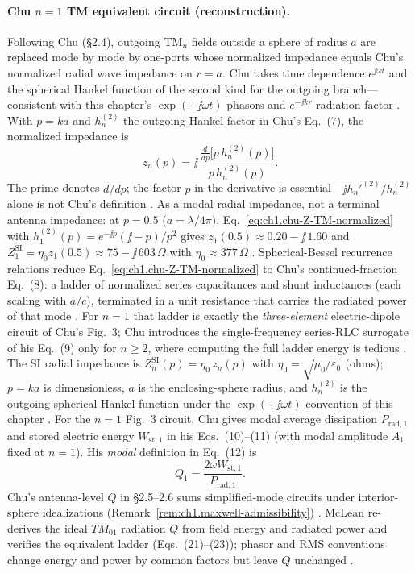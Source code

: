\paragraph{Chu $n=1$ TM equivalent circuit (reconstruction).}
Following Chu \cite{chu1948,chu1948tr064} (\S2.4), outgoing TM$_n$ fields outside a sphere of radius $a$ are replaced mode by mode by one-ports whose normalized impedance equals Chu's normalized radial wave impedance on $r=a$. Chu takes time dependence $e^{\jj\omega t}$ and the spherical Hankel function of the second kind for the outgoing branch---consistent with this chapter's $\exp(+\jj\omega t)$ phasors and $e^{-\jj kr}$ radiation factor \cite{chu1948,chu1948tr064,stratton1941}. With $p=ka$ and $h_n^{(2)}$ the outgoing Hankel factor in Chu's Eq.~(7), the normalized impedance is
\begin{equation}
\label{eq:ch1.chu-Z-TM-normalized}
z_n(p)=\jj\,\frac{\displaystyle\frac{d}{dp}\bigl[p\,h_n^{(2)}(p)\bigr]}{p\,h_n^{(2)}(p)}.
\end{equation}
The prime denotes $d/dp$; the factor $p$ in the derivative is essential---$\jj h_n'^{(2)}/h_n^{(2)}$ alone is not Chu's definition \cite{chu1948tr064}. As a modal radial impedance, not a terminal antenna impedance: at $p=0.5$ ($a=\lambda/4\pi$), Eq.~\eqref{eq:ch1.chu-Z-TM-normalized} with $h_1^{(2)}(p)=e^{-\jj p}(\jj-p)/p^2$ gives $z_1(0.5)\approx0.20-\jj\,1.60$ and $Z_1^{\mathrm{SI}}=\eta_0 z_1(0.5)\approx75-\jj\,603\,\Omega$ with $\eta_0\approx377\,\Omega$ \cite{chu1948tr064,stratton1941}. Spherical-Bessel recurrence relations reduce Eq.~\eqref{eq:ch1.chu-Z-TM-normalized} to Chu's continued-fraction Eq.~(8): a ladder of normalized series capacitances and shunt inductances (each scaling with $a/c$), terminated in a unit resistance that carries the radiated power of that mode \cite{chu1948tr064}. For $n=1$ that ladder is exactly the \emph{three-element} electric-dipole circuit of Chu's Fig.~3; Chu introduces the single-frequency series-RLC surrogate of his Eq.~(9) only for $n\ge2$, where computing the full ladder energy is tedious \cite{chu1948tr064}. The SI radial impedance is $Z_n^{\mathrm{SI}}(p)=\eta_0\,z_n(p)$ with $\eta_0=\sqrt{\mu_0/\varepsilon_0}$ (ohms); $p=ka$ is dimensionless, $a$ is the enclosing-sphere radius, and $h_n^{(2)}$ is the outgoing spherical Hankel function under the $\exp(+\jj\omega t)$ convention of this chapter \cite{chu1948,stratton1941}. For the $n=1$ Fig.~3 circuit, Chu gives modal average dissipation $P_{\mathrm{rad,1}}$ and stored electric energy $W_{\mathrm{st,1}}$ in his Eqs.~(10)--(11) (with modal amplitude $A_1$ fixed at $n=1$). His \emph{modal} definition in Eq.~(12) is
\begin{equation}
\label{eq:ch1.chu-Qn-def}
Q_1=\frac{2\omega W_{\mathrm{st,1}}}{P_{\mathrm{rad,1}}}.
\end{equation}
Chu's antenna-level $Q$ in \S2.5--2.6 sums simplified-mode circuits under interior-sphere idealizations (Remark~\ref{rem:ch1.maxwell-admissibility}) \cite{chu1948,chu1948tr064,mcclean1996}. McLean \cite{mcclean1996} re-derives the ideal $TM_{01}$ radiation $Q$ from field energy and radiated power and verifies the equivalent ladder (Eqs.~(21)--(23)); phasor and RMS conventions change energy and power by common factors but leave $Q$ unchanged \cite{mcclean1996,chu1948tr064}.

